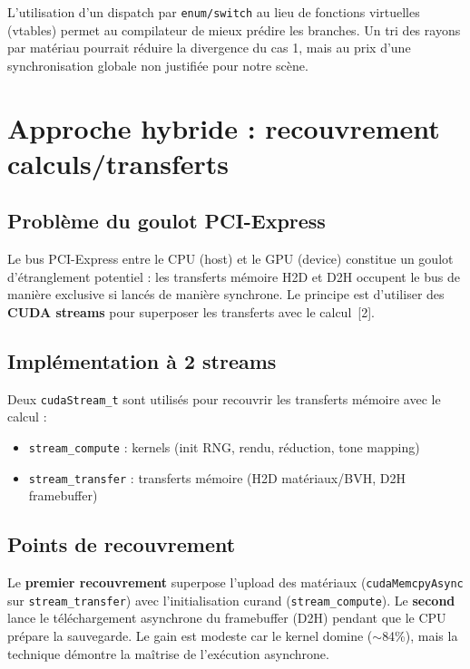 \documentclass[12pt,a4paper]{article}
\begin{document}
L'utilisation d'un dispatch par \texttt{enum/switch} au lieu de fonctions virtuelles (vtables) permet au compilateur de mieux pr\'{e}dire les branches. Un tri des rayons par mat\'{e}riau pourrait r\'{e}duire la divergence du cas 1, mais au prix d'une synchronisation globale non justifi\'{e}e pour notre sc\`{e}ne.

\section{Approche hybride : recouvrement calculs/transferts}

\subsection{Probl\`{e}me du goulot PCI-Express}

Le bus PCI-Express entre le CPU (host) et le GPU (device) constitue un goulot d'\'{e}tranglement potentiel : les transferts m\'{e}moire H2D et D2H occupent le bus de mani\`{e}re exclusive si lanc\'{e}s de mani\`{e}re synchrone. Le principe est d'utiliser des \textbf{CUDA streams} pour superposer les transferts avec le calcul~[2].

\subsection{Impl\'{e}mentation \`{a} 2 streams}

Deux \texttt{cudaStream\_t} sont utilis\'{e}s pour recouvrir les transferts m\'{e}moire avec le calcul :
\begin{itemize}
    \item \texttt{stream\_compute} : kernels (init RNG, rendu, r\'{e}duction, tone mapping)
    \item \texttt{stream\_transfer} : transferts m\'{e}moire (H2D mat\'{e}riaux/BVH, D2H framebuffer)
\end{itemize}

\subsection{Points de recouvrement}

Le \textbf{premier recouvrement} superpose l'upload des mat\'{e}riaux (\texttt{cudaMemcpyAsync} sur \texttt{stream\_transfer}) avec l'initialisation curand (\texttt{stream\_compute}). Le \textbf{second} lance le t\'{e}l\'{e}chargement asynchrone du framebuffer (D2H) pendant que le CPU pr\'{e}pare la sauvegarde. Le gain est modeste car le kernel domine ($\sim$84\%), mais la technique d\'{e}montre la ma\^{i}trise de l'ex\'{e}cution asynchrone.
\end{document}

